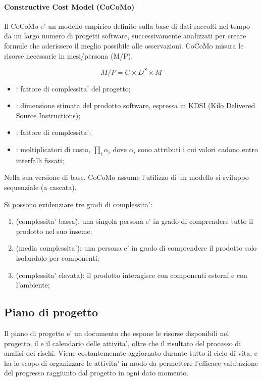 \paragraph{Constructive Cost Model (CoCoMo)}

Il CoCoMo e' un modello empirico definito sulla base di dati raccolti nel tempo
da un largo numero di progetti software, successivamente analizzati per creare
formule che aderissero il meglio possibile alle osservazioni. CoCoMo misura le
risorse necessarie in mesi/persona (M/P).

\[
  M/P = C \times D^S \times M
\]

\begin{itemize}
  \item {}: fattore di complessita' del progetto;
  \item {}: dimensione stimata del prodotto software, espressa in KDSI
    (Kilo Delivered Source Instructions);
  \item {}: fattore di complessita';
  \item {}: moltiplicatori di costo, $\prod_i \alpha_i$ dove $\alpha_i$
    sono attributi i cui valori cadono entro interfalli fissati;
\end{itemize}

Nella sua versione di base, CoCoMo assume l'utilizzo di un modello si sviluppo
sequenziale (a cascata). 

Si possono evidenziare tre gradi di complessita':

\begin{enumerate}
  \item {} (complessita' bassa): una singola persona e' in grado
    di comprendere tutto il prodotto nel suo inseme;
  \item {} (media complessita'): una persona e' in grado di
    comprendere il prodotto solo isolandolo per componenti;
  \item {} (complessita' elevata): il prodotto
    interagisce con componenti esterni e con l'ambiente;
\end{enumerate}


\subsection{Piano di progetto}

Il piano di progetto e' un documento che espone le risorse disponibili nel
progetto, il  e il calendario delle attivita', oltre
che il risultato del processo di analisi dei rischi. Viene costantemennte
aggiornato durante tutto il ciclo di vita, e ha lo scopo di organizzare le
attivita' in modo da permettere l'efficace valutazione del progresso raggiunto
dal progetto in ogni dato momento.


